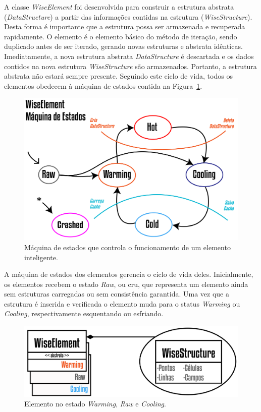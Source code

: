 A classe \textit{WiseElement} foi desenvolvida para construir a estrutura abstrata (\textit{DataStructure}) a partir das informações contidas na estrutura (\textit{WiseStructure}). Desta forma é importante que a estrutura possa ser armazenada e recuperada rapidamente. O elemento é o elemento básico do método de iteração, sendo duplicado antes de ser iterado, gerando novas estruturas e abstrata idênticas. Imediatamente, a nova estrutura abstrata \textit{DataStructure} é descartada e os dados contidos na nova estrutura \textit{WiseStructure} são armazenados. Portanto, a estrutura abstrata não estará sempre presente. Seguindo este ciclo de vida, todos os elementos obedecem à máquina de estados contida na Figura~\ref{fig3:wiselementstatus}.

\begin{figure}[!htbp]
	\centering
	\includegraphics[scale=1.5]{Figures/WiseElementStatus@16x.png}
	\caption{Máquina de estados que controla o funcionamento de um elemento inteligente.}
	\label{fig3:wiselementstatus}
\end{figure}

A máquina de estados dos elementos gerencia o ciclo de vida deles. Inicialmente, os elementos recebem o estado \textit{Raw}, ou cru, que representa um elemento ainda sem estruturas carregadas ou sem consistência garantida. Uma vez que a estrutura é inserida e verificada o elemento muda para o status \textit{Warming} ou \textit{Cooling}, respectivamente esquentando ou esfriando.

\begin{figure}[!htbp]
	\centering
	\includegraphics[scale=1.85]{Figures/WiseElementWarming@16x.png}
	\caption{Elemento no estado \textit{Warming}, \textit{Raw} e \textit{Cooling}.}
	\label{fig4:wiselementwarming}
\end{figure}

